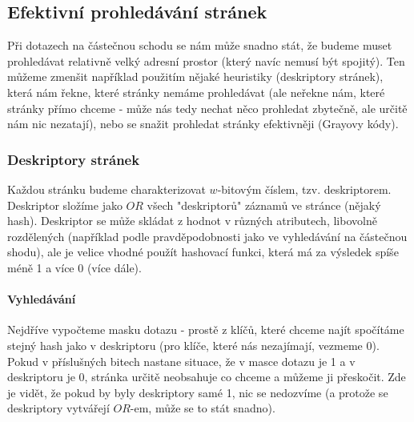 \documentclass[a4paper,12pt]{article}
\begin{document}
\subsection{Efektivní prohledávání stránek}
\setcounter{equation}{0}
Při dotazech na částečnou schodu se nám může snadno stát, že budeme muset 
prohledávat relativně velký adresní prostor (který navíc nemusí být spojitý).  
Ten můžeme zmenšit například použitím nějaké heuristiky (deskriptory stránek), 
která nám řekne, které stránky nemáme prohledávat (ale neřekne nám, které 
stránky přímo chceme - může nás tedy nechat něco prohledat zbytečně, ale určitě 
nám nic nezatají), nebo se snažit prohledat stránky efektivněji (Grayovy kódy).
\subsubsection{Deskriptory stránek}
\setcounter{equation}{0}
Každou stránku budeme charakterizovat $w$-bitovým číslem, tzv. deskriptorem.  
Deskriptor složíme jako $OR$ všech "deskriptorů" záznamů ve stránce (nějaký 
hash). Deskriptor se může skládat z hodnot v různých atributech, libovolně 
rozdělených (například podle pravděpodobnosti jako ve vyhledávání na částečnou 
shodu), ale je velice vhodné použít hashovací funkci, která má za výsledek spíše 
méně 1 a více 0 (více dále).

\paragraph{Vyhledávání}
Nejdříve vypočteme masku dotazu - prostě z klíčů, které chceme najít spočítáme 
stejný hash jako v deskriptoru (pro klíče, které nás nezajímají, vezmeme 0).  
Pokud v příslušných bitech  nastane situace, že v masce dotazu je 1 a v 
deskriptoru je 0, stránka určitě neobsahuje co chceme a můžeme ji přeskočit. Zde 
je vidět, že pokud by byly deskriptory samé 1, nic se nedozvíme (a protože se 
deskriptory vytvářejí $OR$-em, může se to stát snadno).
\end{document}
